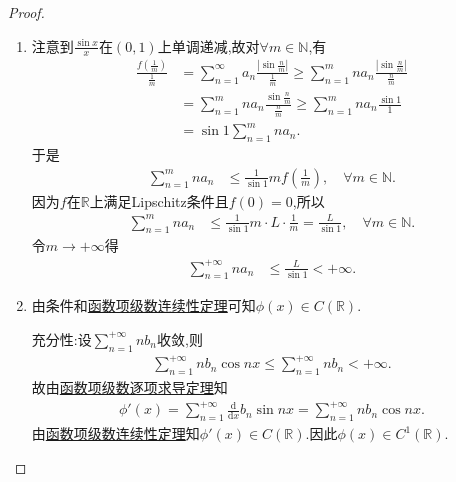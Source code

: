 \documentclass[../../main.tex]{subfiles}
\begin{document}
\begin{proof}
\begin{enumerate}
\item 注意到$\frac{\sin x}{x}$在$\left( 0,1 \right)$上单调递减,故对$\forall m\in \mathbb{N}$,有
\begin{align*}
\frac{f\left( \frac{1}{m} \right)}{\frac{1}{m}}&=\sum_{n=1}^{\infty}{a_n\frac{\left| \sin \frac{n}{m} \right|}{\frac{1}{m}}}\geqslant \sum_{n=1}^m{na_n\frac{\left| \sin \frac{n}{m} \right|}{\frac{n}{m}}}
\\
&=\sum_{n=1}^m{na_n\frac{\sin \frac{n}{m}}{\frac{n}{m}}}\geqslant \sum_{n=1}^m{na_n\frac{\sin 1}{1}}
\\
&=\sin 1\sum_{n=1}^m{na_n.}
\end{align*}
于是
\begin{align*}
\sum_{n=1}^m{na_n}&\leqslant \frac{1}{\sin 1}m f\left( \frac{1}{m} \right),\quad \forall m\in \mathbb{N}.
\end{align*}
因为$f$在$\mathbb{R}$上满足Lipschitz条件且$f\left( 0 \right) =0$,所以
\begin{align*}
\sum_{n=1}^m{na_n}&\leqslant \frac{1}{\sin 1}m \cdot L \cdot \frac{1}{m}=\frac{L}{\sin 1},\quad \forall m\in \mathbb{N}.
\end{align*}
令$m\rightarrow +\infty$得
\begin{align*}
\sum_{n=1}^{+\infty}{na_n}&\leqslant \frac{L}{\sin 1}<+\infty.
\end{align*}

\item 由条件和\hyperref[theorem:函数项级数连续性定理]{函数项级数连续性定理}可知$\phi \left( x \right) \in C\left( \mathbb{R} \right)$.

{\heiti 充分性:}设$\sum_{n=1}^{+\infty}{nb_n}$收敛,则
\begin{align*}
\sum_{n=1}^{+\infty}{nb_n\cos nx}\leqslant \sum_{n=1}^{+\infty}{nb_n}<+\infty.
\end{align*}
故由\hyperref[theorem:函数项级数逐项求导定理]{函数项级数逐项求导定理}知
\begin{align*}
\phi'\left( x \right) =\sum_{n=1}^{+\infty}{\frac{\mathrm{d}}{\mathrm{d}x}b_n\sin nx}=\sum_{n=1}^{+\infty}{nb_n\cos nx}.
\end{align*}
由\hyperref[theorem:函数项级数连续性定理]{函数项级数连续性定理}知$\phi' \left( x \right) \in C\left( \mathbb{R} \right)$.因此$\phi \left( x \right) \in C^1\left( \mathbb{R} \right)$.


\end{enumerate}
\end{proof}
\end{document}
